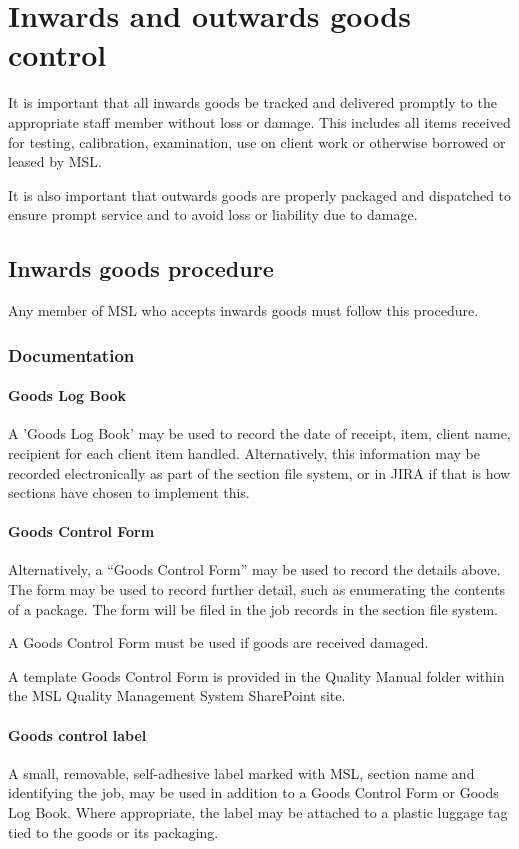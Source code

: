 \section{Inwards and outwards goods control}
\label{s:inwards_outwards_goods}
It is important that all inwards goods be tracked and delivered promptly to the appropriate staff member without loss or damage. This includes all items received for testing, calibration, examination, use on client work or otherwise borrowed or leased by MSL.

It is also important that outwards goods are properly packaged and dispatched to ensure prompt service and to avoid loss or liability due to damage.

\subsection{Inwards goods procedure}
Any member of MSL who accepts inwards goods must follow this procedure.

\subsubsection{Documentation}
\paragraph{Goods Log Book}
A 'Goods Log Book' may be used to record the date of receipt, item, client name, recipient for each client item handled. Alternatively, this information may be recorded electronically as part of the section file system, or in JIRA if that is how sections have chosen to implement this.

\paragraph{Goods Control Form}
Alternatively, a ``Goods Control Form'' may be used to record the details above.  The form may be used to record further detail, such as enumerating the contents of a package. The form will be filed in the job records in the section file system. 

A Goods Control Form must be used if goods are received damaged.

A template Goods Control Form is provided in the Quality Manual folder within the MSL Quality Management System SharePoint site.

\paragraph{Goods control label}
A small, removable, self-adhesive label marked with MSL, section name and identifying the job, may be used in addition to a Goods Control Form or Goods Log Book. Where appropriate, the label may be attached to a plastic luggage tag tied to the goods or its packaging.

